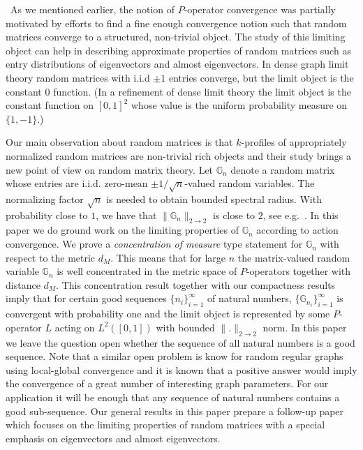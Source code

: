 \documentclass[a4wider]{amsart}
\theoremstyle{definitionbreak}\newtheorem{D}[theorem]{Definition}
\theoremstyle{definitionbreak}\newtheorem*{D*}{Definition}
\begin{document}
~As we mentioned earlier, the notion of $P$-operator convergence was partially motivated by efforts to find a fine enough convergence notion such that random matrices converge to a structured, non-trivial object. The study of this limiting object can help in describing approximate properties of random matrices such as entry distributions of eigenvectors and almost eigenvectors.  In dense graph limit theory random matrices with i.i.d $\pm 1$ entries converge, but the limit object is the constant $0$ function. (In a refinement  of dense limit theory \cite{kunszenti} the limit object is the constant function on $[0,1]^2$ whose value is the uniform probability measure on $\{1,-1\}$.) 


Our main observation about random matrices is that $k$-profiles of appropriately normalized random matrices are non-trivial rich objects and their study brings a new point of view on random matrix theory. Let $\mathbb{G}_n$ denote a random matrix whose entries are i.i.d. zero-mean $\pm 1/\sqrt{n}$-valued random variables. The normalizing factor $\sqrt{n}$ is needed to obtain bounded spectral radius. With probability close to $1$, we have that $\|\mathbb{G}_n\|_{2\to 2}$ is close to $2$, see e.g.\ \cite{geman}. In this paper we do ground work on the limiting properties of $\mathbb{G}_n$ according to action convergence. We prove a {\it concentration of measure} type statement for $\mathbb{G}_n$ with respect to the metric $d_M$. This means that for large $n$ the matrix-valued random variable $\mathbb{G}_n$ is well concentrated in the metric space of $P$-operators together with distance $d_M$. This concentration result together with our compactness results imply that for certain good sequences $\{n_i\}_{i=1}^\infty$ of natural numbers, $\{\mathbb{G}_{n_i}\}_{i=1}^\infty$ is convergent with probability one and the limit object is represented by some $P$-operator $L$ acting on $L^2([0,1])$ with bounded $\|.\|_{2\to 2}$ norm. In this paper we leave the question open whether the sequence of all natural numbers is a good sequence. Note that a similar open problem is know for random regular graphs using local-global convergence \cite{large} and it is known that a positive answer would imply the convergence of a great number of interesting graph parameters. For our application it will be enough that any sequence of natural numbers contains a good sub-sequence. Our general results in this paper prepare a follow-up paper which focuses on the limiting properties of random matrices with a special emphasis on eigenvectors and almost eigenvectors.
\end{document}
